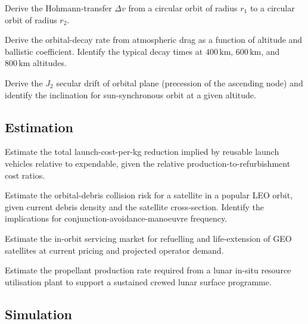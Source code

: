 \begin{exercise}
Derive the Hohmann-transfer $\Delta v$ from a circular orbit of radius $r_1$ to a circular orbit of radius $r_2$.
\end{exercise}

\begin{exercise}
Derive the orbital-decay rate from atmospheric drag as a function of altitude and ballistic coefficient. Identify the typical decay times at $400\,\text{km}$, $600\,\text{km}$, and $800\,\text{km}$ altitudes.
\end{exercise}

\begin{exercise}
Derive the $J_2$ secular drift of orbital plane (precession of the ascending node) and identify the inclination for sun-synchronous orbit at a given altitude.
\end{exercise}

\subsection*{Estimation}

\begin{exercise}
Estimate the total launch-cost-per-kg reduction implied by reusable launch vehicles relative to expendable, given the relative production-to-refurbishment cost ratios.
\end{exercise}

\begin{exercise}
Estimate the orbital-debris collision risk for a satellite in a popular LEO orbit, given current debris density and the satellite cross-section. Identify the implications for conjunction-avoidance-manoeuvre frequency.
\end{exercise}

\begin{exercise}
Estimate the in-orbit servicing market for refuelling and life-extension of GEO satellites at current pricing and projected operator demand.
\end{exercise}

\begin{exercise}
Estimate the propellant production rate required from a lunar in-situ resource utilisation plant to support a sustained crewed lunar surface programme.
\end{exercise}

\subsection*{Simulation}

